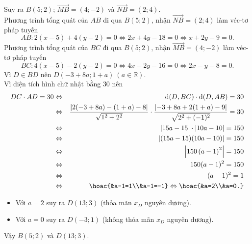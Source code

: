 \begin{bt}
{\begin{itemize}
\end{itemize}
Suy ra $B(5;2)$; $\overrightarrow{MB}=(4;-2)$ và $\overrightarrow{NB}=(2;4)$.\\
Phương trình tổng quát của $AB$ đi qua $B(5;2)$, nhận $\overrightarrow{NB}=(2;4)$ làm véc-tơ pháp tuyến
\[AB\colon 2(x-5)+4(y-2)=0\Leftrightarrow 2x+4y-18=0\Leftrightarrow x+2y-9=0. \]
Phương trình tổng quát của $BC$ đi qua $B(5;2)$, nhận $\overrightarrow{MB}=(4;-2)$ làm véc-tơ pháp tuyến
\[BC\colon 4(x-5)-2(y-2)=0\Leftrightarrow 4x-2y-16=0\Leftrightarrow 2x-y-8=0. \]
Vì $D\in BD$ nên $D(-3+8a;1+a)\ (a\in\mathbb{R})$.\\
Vì diện tích hình chữ nhật bằng $30$ nên
\allowdisplaybreaks
\begin{eqnarray*}
DC\cdot AD=30&\Leftrightarrow &\mathrm{d}(D,BC)\cdot \mathrm{d}(D,AB)=30\\
&\Leftrightarrow &\dfrac{\left|2(-3+8a)-(1+a)-8\right|}{\sqrt{1^2+2^2}}\cdot\dfrac{\left|-3+8a+2(1+a)-9\right|}{\sqrt{2^2+(-1)^2}}=30\\
&\Leftrightarrow &\left|15a-15\right|\cdot\left|10a-10\right|=150\\
&\Leftrightarrow &\left|(15a-15)(10a-10)\right|=150\\
&\Leftrightarrow &\left|150\left(a-1\right)^2\right|=150\\
&\Leftrightarrow &150(a-1)^2=150\\
&\Leftrightarrow &(a-1)^2=1\\
&\Leftrightarrow &\hoac{&a-1=1\\&a-1=-1}\Leftrightarrow\hoac{&a=2\\&a=0.}
\end{eqnarray*}
\begin{itemize}
	\item Với $a=2$ suy ra $D(13;3)$ (thỏa mãn $x_D$ nguyên dương).
	\item Với $a=0$ suy ra $D(-3;1)$ (không thỏa mãn $x_D$ nguyên dương).
\end{itemize}
Vậy $B(5;2)$ và $D(13;3)$.
}
\end{bt}

